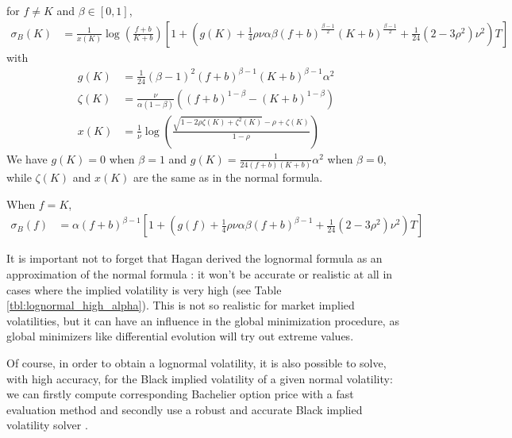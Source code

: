 \documentclass[]{rAMF2e}
\begin{document}
for $f \neq K$ and $\beta \in [0,1]$,
\begin{align}
\sigma_B(K) &= \frac{1}{x(K)}\log\left(\frac{f+b}{K+b}\right)\left[1+\left(g(K)+\frac{1}{4}\rho\nu\alpha\beta(f+b)^{\frac{\beta-1}{2}}(K+b)^{\frac{\beta-1}{2}}+\frac{1}{24}(2-3\rho^2)\nu^2\right)T\right]
\end{align}
with 
\begin{align*}
g(K) &= \frac{1}{24} (\beta-1)^2 (f+b)^{\beta-1} (K+b)^{\beta-1} \alpha^2\\
\zeta(K) &= \frac{\nu}{\alpha (1-\beta)} \left( (f+b)^{1-\beta} - (K+b)^{1-\beta} \right)\\
x(K) &= \frac{1}{\nu}\log\left(\frac{\sqrt{1-2\rho\zeta(K)+\zeta^2(K)}-\rho+\zeta(K)}{1-\rho} \right)
\end{align*}
%
We have $g(K) = 0$ when $\beta = 1$ and $g(K) = \frac{1}{24(f+b)(K+b)}\alpha^2$ when $\beta = 0$, while $\zeta(K)$ and $x(K)$ are the same as in the normal formula.

When $f=K$, 
\begin{align}
\sigma_B(f) &= \alpha (f+b)^{\beta-1} \left[1+\left(g(f)+\frac{1}{4}\rho\nu\alpha\beta(f+b)^{\beta-1}+\frac{1}{24}(2-3\rho^2)\nu^2\right)T\right]
\end{align}

It is important not to forget that Hagan derived the lognormal formula as an approximation of the normal formula \citep{hagan2002managing}: it won't be accurate or realistic at all in cases where the implied volatility is very high (see Table \ref{tbl:lognormal_high_alpha}). This is not so realistic for market implied volatilities, but it can have an influence in the global minimization procedure, as global minimizers like differential evolution will try out extreme values.

Of course, in order to obtain a lognormal volatility, it is also possible to solve, with high accuracy, for the Black implied volatility of a given normal volatility: we can firstly compute corresponding Bachelier option price with a fast evaluation method \citep{lefloch2014bpvol} and secondly use a robust and accurate Black implied volatility solver \citep{jackel2013let, li2011adaptive}.
\end{document}
